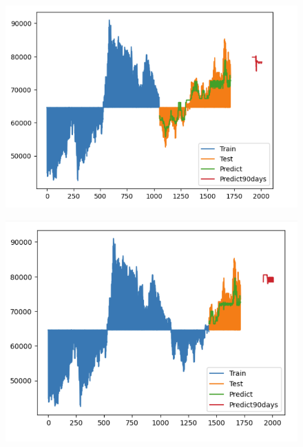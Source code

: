 \documentclass{article}
\begin{document}
\begin{multicols}{2}
\begin{figure}[H]
    \centering
    \begin{minipage}{0.15\textwidth}
    \centering
    \includegraphics[width=1\textwidth]{Image/Light GBM/SS_6_4_90.png}
   
    \label{fig:1}
    \end{minipage}%
    \begin{minipage}{0.15\textwidth}
    \centering
    \includegraphics[width=1\textwidth]{Image/Light GBM/SS_7_3_90.png}
  

\end{minipage}
\end{figure}
\end{multicols}
\end{document}
